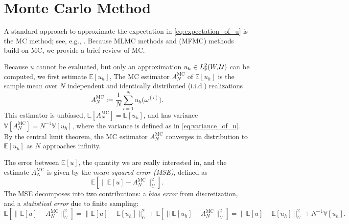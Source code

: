 
\section{Monte Carlo Method}\label{sec:MC}

A standard approach to approximate the expectation in \eqref{eq:expectation_of_u} is the MC method; 
see, e.g.,  \cite{MBGiles_2015a,MDGunzburger_CGWebster_GZhang_2014a}.
Because MLMC methods \cite{MBGiles_2015a,SHeinrich_2001a} and 
(MFMC) methods  \cite{BPeherstorfer_KWillcox_MDGunzburger_2016a, BPeherstorfer_KWillcox_MDGunzburger_2018a}  build on MC, we provide a brief review of MC.


Because $u$ cannot be evaluated, but only an approximation $u_h \in   L_{\mathbb{P}}^2(W, \mathcal{U})$ can be 
computed, we first estimate $\mathbb{E}[u_h ]$, 
The MC estimator $A^{\text{MC}}_{N}$ of $\mathbb{E}[u_h ]$ 
is the sample mean over $N$ independent and identically distributed (i.i.d.) realizations 
\begin{equation}\label{eq:MC_estimator}
    A^{\text{MC}}_{N} := \frac{1}{N}\sum_{i=1}^{N} u_h \big(\omega^{(i)} \big).
\end{equation}
%
This estimator is unbiased,  $\mathbb{E}[A^{\text{MC}}_{N}] = \mathbb{E}[u_h ]$, 
and has variance $\mathbb{V}[A^{\text{MC}}_{N}] = N^{-1} \mathbb{V}[u_h ]$, 
where the variance is defined as in \eqref{eq:variance_of_u}.
By the central limit theorem, the MC estimator $A^{\text{MC}}_{N}$ converges in distribution to $\mathbb{E}[u_h]$ as $N$ approaches infinity. 

The error between $\mathbb{E}[u]$, the quantity we are really interested in, and the estimate $A^{\text{MC}}_{N}$ 
is given by the  {\it mean squared error (MSE)}, defined as
 \[
            \mathbb E\left[ \big\| \mathbb{E}[u]-A^{\text{MC}}_{N}  \big\| _{U}^2\right].  
 \] 
The MSE decomposes into two contributions: a {\it bias error} from  discretization, and a {\it statistical error} due to finite sampling:
%
\begin{equation}  \label{eq:MC-MSE}
\mathbb E\left[ \big\| \mathbb{E}[u]-A^{\text{MC}}_{N}  \big\| _{U}^2\right]
= \big\| \mathbb{E}[u]-\mathbb{E}[u_h ]  \big\| _{U}^2
               +\mathbb E\left[ \big\|  \mathbb{E}[u_h ] -A^{\text{MC}}_{N}  \big\| _{U}^2\right]
= \big\| \mathbb{E}[u]-\mathbb{E}[u_h ]  \big\| _{U}^2
    + N^{-1} \mathbb{V}\left[u_h \right].
\end{equation}



